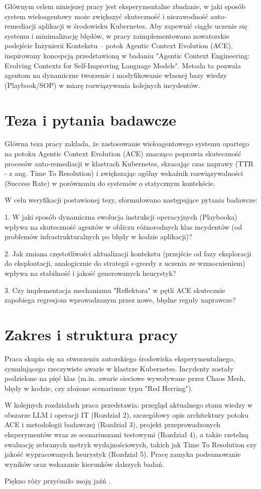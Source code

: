 Głównym celem niniejszej pracy jest eksperymentalne zbadanie, w jaki sposób system wieloagentowy może zwiększyć skuteczność i niezawodność auto-remediacji aplikacji w środowisku Kubernetes. 
Aby zapewnić ciągłe uczenie się systemu i minimalizację błędów, w pracy zaimplementowano nowatorskie podejście Inżynierii Kontekstu – potok Agentic Context Evolution (ACE), 
inspirowany koncepcją przedstawioną w badaniu "Agentic Context Engineering: Evolving Contexts for Self-Improving Language Models". Metoda ta pozwala agentom na dynamiczne tworzenie i 
modyfikowanie własnej bazy wiedzy (Playbook/SOP) w miarę rozwiązywania kolejnych incydentów.

\section{Teza i pytania badawcze}
Główna teza pracy zakłada, że zastosowanie wieloagentowego systemu opartego na potoku Agentic Context Evolution (ACE) 
znacząco poprawia skuteczność procesów auto-remediacji w klastrach Kubernetes, skracając czas naprawy (TTR - z ang. Time To Resolution) i zwiększając ogólny wskaźnik rozwiązywalności 
(Success Rate) w porównaniu do systemów o statycznym kontekście.


W celu weryfikacji postawionej tezy, sformułowano następujące pytania badawcze: \newline

1. W jaki sposób dynamiczna ewolucja instrukcji operacyjnych (Playbooka) wpływa na skuteczność agentów w obliczu różnorodnych klas incydentów (od problemów infrastrukturalnych po błędy w kodzie aplikacji)?

2. Jak zmiana częstotliwości aktualizacji kontekstu (przejście od fazy eksploracji do eksploatacji, analogicznie do strategii $\epsilon$-greedy z uczenia ze wzmocnieniem) wpływa na stabilność i jakość generowanych heurystyk?

3. Czy implementacja mechanizmu "Reflektora" w pętli ACE skutecznie zapobiega regresjom wprowadzanym przez nowe, błędne reguły naprawcze?

\section{Zakres i struktura pracy}

Praca skupia się na stworzeniu autorskiego środowiska eksperymentalnego, symulującego rzeczywiste awarie w klastrze Kubernetes. Incydenty zostały podzielone na pięć klas (m.in. awarie sieciowe wywoływane przez Chaos Mesh, błędy w kodzie, czy złożone scenariusze typu "Red Herring").

W kolejnych rozdziałach praca przedstawia: przegląd aktualnego stanu wiedzy w obszarze LLM i operacji IT (Rozdział 2),
 szczegółowy opis architektury potoku ACE i metodologii badawczej (Rozdział 3), projekt przeprowadzonych eksperymentów wraz ze scenariuszami testowymi (Rozdział 4),
  a także rzetelną ewaluację zebranych metryk wydajnościowych, 
takich jak Time To Resolution czy jakość wypracowanych heurystyk (Rozdział 5). Pracę zamyka podsumowanie wyników oraz wskazanie kierunków dalszych badań.

Piękno róży przyćmiło moją jaźń \cite{cleancode, booking:_nodate}. 

